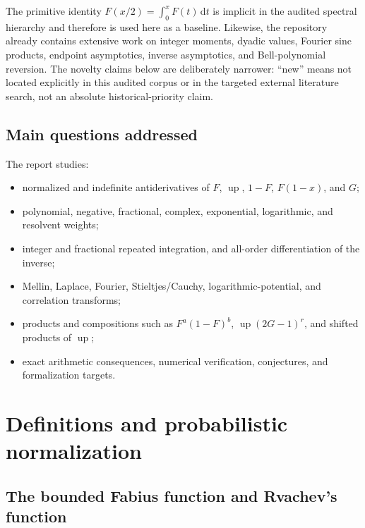 \documentclass[11pt,oneside]{article}
\theoremstyle{definition}
\theoremstyle{remark}
\newcommand{\dd}{\,\mathrm d}
\newcommand{\upf}{\operatorname{up}}
\begin{document}
The primitive identity $F(x/2)=\int_0^xF(t)\dd t$ is implicit in the audited spectral hierarchy and therefore is used here as a baseline.  Likewise, the repository already contains extensive work on integer moments, dyadic values, Fourier sinc products, endpoint asymptotics, inverse asymptotics, and Bell-polynomial reversion.  The novelty claims below are deliberately narrower: ``new'' means not located explicitly in this audited corpus or in the targeted external literature search, not an absolute historical-priority claim.

\subsection{Main questions addressed}

The report studies:
\begin{itemize}
\item normalized and indefinite antiderivatives of $F$, $\upf$, $1-F$, $F(1-x)$, and $G$;
\item polynomial, negative, fractional, complex, exponential, logarithmic, and resolvent weights;
\item integer and fractional repeated integration, and all-order differentiation of the inverse;
\item Mellin, Laplace, Fourier, Stieltjes/Cauchy, logarithmic-potential, and correlation transforms;
\item products and compositions such as $F^a(1-F)^b$, $\upf(2G-1)^r$, and shifted products of $\upf$;
\item exact arithmetic consequences, numerical verification, conjectures, and formalization targets.
\end{itemize}

\section{Definitions and probabilistic normalization}

\subsection{The bounded Fabius function and Rvachev's function}
\end{document}
